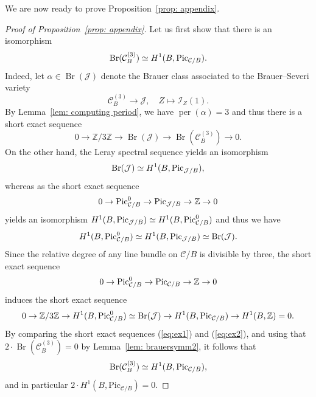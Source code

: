 \documentclass[11pt]{amsart}
\theoremstyle{plain}
\theoremstyle{definition}
\theoremstyle{remark}
\DeclareMathOperator{\Br}{Br}
\newcommand{\Pic}{\mathop{\rm Pic}\nolimits}
\begin{document}
We are now ready to prove Proposition~\ref{prop: appendix}.
\begin{proof}[Proof of Proposition~\ref{prop: appendix}]
Let us first show that there is an isomorphism $$\Br(\mathcal C^{(3)}_B) \simeq H^1(B, \Pic_{\mathcal C/B}).$$
Indeed, let $\alpha \in \Br(\mathcal J)$ denote the Brauer class associated to the Brauer--Severi variety
$$\mathcal C_B^{(3)} \to \mathcal J,\quad Z \mapsto \mathcal I_Z(1).$$
By Lemma~\ref{lem: computing period}, we have $\operatorname{per}(\alpha) = 3$ and thus there is a short exact sequence
\begin{equation}\label{eq:ex1}0 \to \mathbb Z / 3 \mathbb Z \to \Br(\mathcal J) \to \Br(\mathcal C_B^{(3)}) \to 0.\end{equation}
On the other hand, the Leray spectral sequence yields an isomorphism
$$\Br(\mathcal J) \simeq H^1(B, \Pic_{\mathcal J/ B}),$$
whereas as the short exact sequence
$$0 \to \Pic^0_{\mathcal C / B} \to \Pic_{\mathcal J/B} \to \mathbb Z \to 0$$
yields an isomorphism $H^1(B, \Pic_{\mathcal J/B}) \simeq H^1(B, \Pic^0_{\mathcal C / B})$ and thus we have
$$H^1(B, \Pic^0_{\mathcal C / B}) \simeq H^1(B, \mathrm{Pic}_{\mathcal J / B}) \simeq \Br(\mathcal J).$$
Since the relative degree of any line bundle on $\mathcal C / B$ is divisible by three, the short exact sequence
$$0 \to \Pic^0_{\mathcal C / B} \to \Pic_{\mathcal C / B} \to \mathbb Z \to 0$$
induces the short exact sequence
\begin{equation}\label{eq:ex2}0 \to \mathbb Z / 3 \mathbb Z \to H^1(B, \Pic^0_{\mathcal C/ B})\simeq \Br(\mathcal J) \to H^1(B, \Pic_{\mathcal C / B}) \to H^1(B, \mathbb Z) = 0.\end{equation}
By comparing the short exact sequences (\ref{eq:ex1}) and (\ref{eq:ex2}), and using that $2 \cdot \Br(\mathcal C^{(3)}_B) = 0$ by Lemma~\ref{lem:  brauersymm2}, it follows that
$$\Br(\mathcal C^{(3)}_{B}) \simeq H^1(B,  \Pic_{\mathcal C/ B}),$$ and in particular $2 \cdot H^1(B, \mathrm{Pic}_{\mathcal C/B}) = 0$.


\end{proof}
\end{document}
